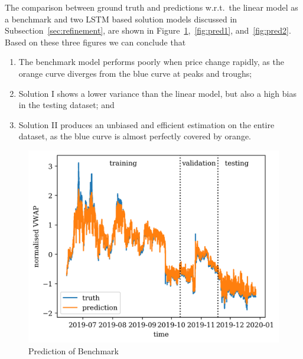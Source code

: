 \documentclass[12pt, letterpaper]{article}
\begin{document}
The comparison between ground truth and predictions w.r.t.\ the linear model as a benchmark and two LSTM based solution models discussed in Subsection~\ref{sec:refinement}, are shown in Figure~\ref{fig:pred0},\ \ref{fig:pred1}, and\ \ref{fig:pred2}. Based on these three figures we can conclude that

\begin{enumerate}
    \item The benchmark model performs poorly when price change rapidly, as the orange curve diverges from the blue curve at peaks and troughs;
    \item Solution I shows a lower variance than the linear model, but also a high bias in the testing dataset; and
    \item Solution II produces an unbiased and efficient estimation on the entire dataset, as the blue curve is almost perfectly covered by orange.
\end{enumerate}

\begin{figure}
    \centering
    \includegraphics{figures/pred_linear.png}
    \caption{Prediction of Benchmark}%
    \label{fig:pred0}
\end{figure}
\end{document}
